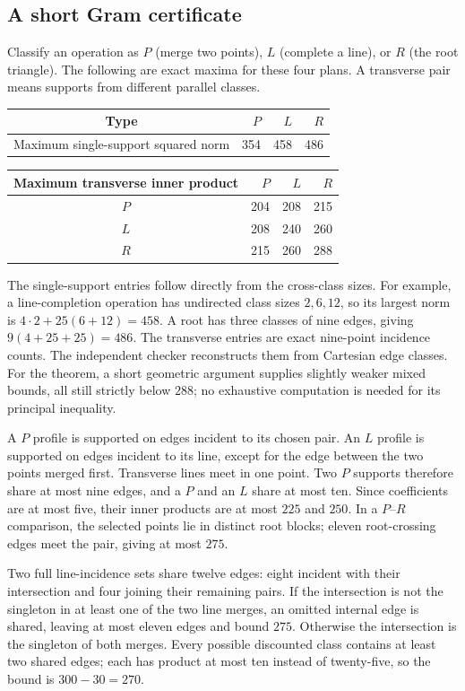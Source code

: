 \subsection{A short Gram certificate}
Classify an operation as $P$ (merge two points), $L$ (complete a line), or
$R$ (the root triangle). The following are exact maxima for these four
plans. A transverse pair means supports from different parallel classes.
\begin{center}
\begin{tabular}{crrr}
\toprule Type & $P$ & $L$ & $R$\\\midrule
Maximum single-support squared norm &354&458&486\\
\bottomrule
\end{tabular}\qquad
\begin{tabular}{c|rrr}
Maximum transverse inner product &$P$&$L$&$R$\\\hline
$P$&204&208&215\\
$L$&208&240&260\\
$R$&215&260&288
\end{tabular}
\end{center}
The single-support entries follow directly from the cross-class sizes.
For example, a line-completion operation has undirected class sizes
$2,6,12$, so its largest norm is $4\cdot2+25(6+12)=458$.
A root has three classes of nine edges, giving $9(4+25+25)=486$.
The transverse entries are exact nine-point incidence counts. The
independent checker reconstructs them from Cartesian edge classes.
For the theorem, a short geometric argument supplies slightly weaker
mixed bounds, all still strictly below $288$; no exhaustive computation
is needed for its principal inequality.

A $P$ profile is supported on edges incident to its chosen pair. An $L$
profile is supported on edges incident to its line, except for the edge
between the two points merged first. Transverse lines meet in one point.
Two $P$ supports therefore share at most nine edges, and a $P$ and an
$L$ share at most ten. Since coefficients are at most five, their inner
products are at most $225$ and $250$. In a $P$--$R$ comparison, the
selected points lie in distinct root blocks; eleven root-crossing edges
meet the pair, giving at most $275$.

Two full line-incidence sets share twelve edges: eight incident with their
intersection and four joining their remaining pairs. If the intersection
is not the singleton in at least one of the two line merges, an omitted internal edge is
shared, leaving at most eleven edges and bound $275$. Otherwise the
intersection is the singleton of both merges. Every possible discounted
class contains at least two shared edges; each has product at most ten
instead of twenty-five, so the bound is $300-30=270$.

